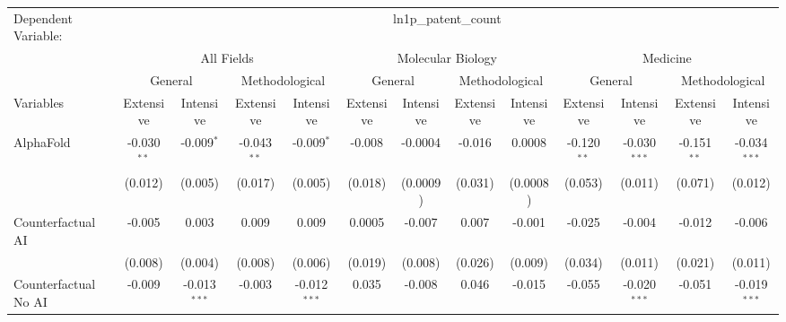 \begingroup
\centering
\begin{tabular}{lcccccccccccc}
   \tabularnewline \midrule \midrule
   Dependent Variable: & \multicolumn{12}{c}{ln1p\_patent\_count}\\
 & \multicolumn{4}{c}{All Fields} & \multicolumn{4}{c}{Molecular Biology} & \multicolumn{4}{c}{Medicine} \\
\cmidrule(lr){2-5} \cmidrule(lr){6-9} \cmidrule(lr){10-13}
 & \multicolumn{2}{c}{General} & \multicolumn{2}{c}{Methodological} & \multicolumn{2}{c}{General} & \multicolumn{2}{c}{Methodological} & \multicolumn{2}{c}{General} & \multicolumn{2}{c}{Methodological} \\
\cmidrule(lr){2-3} \cmidrule(lr){4-5} \cmidrule(lr){6-7} \cmidrule(lr){8-9} \cmidrule(lr){10-11} \cmidrule(lr){12-13}
Variables & \multicolumn{1}{c}{Extensive} & \multicolumn{1}{c}{Intensive} & \multicolumn{1}{c}{Extensive} & \multicolumn{1}{c}{Intensive} & \multicolumn{1}{c}{Extensive} & \multicolumn{1}{c}{Intensive} & \multicolumn{1}{c}{Extensive} & \multicolumn{1}{c}{Intensive} & \multicolumn{1}{c}{Extensive} & \multicolumn{1}{c}{Intensive} & \multicolumn{1}{c}{Extensive} & \multicolumn{1}{c}{Intensive} \\
\cmidrule(lr){1-1}\cmidrule(lr){2-2} \cmidrule(lr){3-3} \cmidrule(lr){4-4} \cmidrule(lr){5-5} \cmidrule(lr){6-6} \cmidrule(lr){7-7} \cmidrule(lr){8-8} \cmidrule(lr){9-9} \cmidrule(lr){10-10} \cmidrule(lr){11-11} \cmidrule(lr){12-12} \cmidrule(lr){13-13}
   AlphaFold                                & -0.030$^{**}$ & -0.009$^{*}$   & -0.043$^{**}$ & -0.009$^{*}$   & -0.008        & -0.0004  & -0.016        & 0.0008   & -0.120$^{**}$ & -0.030$^{***}$ & -0.151$^{**}$ & -0.034$^{***}$\\   
                                            & (0.012)       & (0.005)        & (0.017)       & (0.005)        & (0.018)       & (0.0009) & (0.031)       & (0.0008) & (0.053)       & (0.011)        & (0.071)       & (0.012)\\   
   Counterfactual AI                        & -0.005        & 0.003          & 0.009         & 0.009          & 0.0005        & -0.007   & 0.007         & -0.001   & -0.025        & -0.004         & -0.012        & -0.006\\   
                                            & (0.008)       & (0.004)        & (0.008)       & (0.006)        & (0.019)       & (0.008)  & (0.026)       & (0.009)  & (0.034)       & (0.011)        & (0.021)       & (0.011)\\   
   Counterfactual No AI                     & -0.009        & -0.013$^{***}$ & -0.003        & -0.012$^{***}$ & 0.035         & -0.008   & 0.046         & -0.015   & -0.055        & -0.020$^{***}$ & -0.051        & -0.019$^{***}$\\   

\end{tabular}
